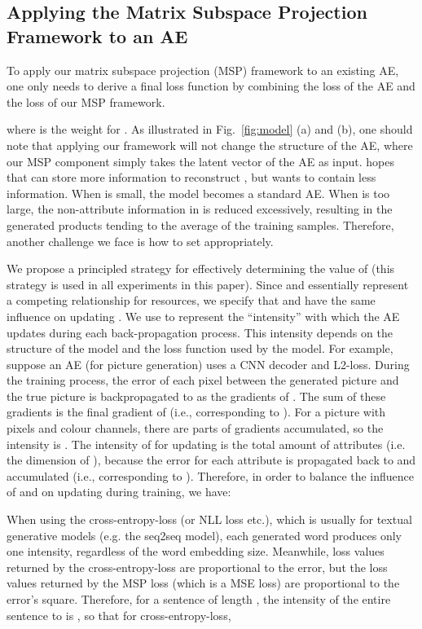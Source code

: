 \documentclass{article}
\begin{document}
\subsection{Applying the Matrix Subspace Projection Framework to an AE} \label{sec:totalLoss}


To apply our matrix subspace projection (MSP) framework to an existing AE, one only needs to derive a final loss function by combining the loss of the AE and the loss of our MSP framework. 

where  is the weight for . As illustrated in Fig.~\ref{fig:model} (a) and (b), one should note that applying our framework will not change the structure of the AE, where our MSP component simply takes the latent vector  of the AE as input.  hopes that  can store more information to reconstruct , but  wants  to contain less information. When  is small, the model becomes a standard AE. When  is too large, the non-attribute information in  is reduced excessively, resulting in the generated products tending to the average of the training samples. Therefore, another challenge we face is how to set  appropriately. 


We propose a principled strategy for effectively determining the value of  (this strategy is used in all experiments in this paper). Since  and  essentially represent a competing relationship for  resources, we specify that  and  have the same influence on updating . We use  to represent the ``intensity'' with which the AE updates  during each back-propagation process. This intensity depends on the structure of the model and the loss function used by the model.
For example, suppose an AE (for picture generation) uses a CNN decoder and L2-loss. During the training process, the error of each pixel between the generated picture and the true picture is backpropagated to  as the gradients of . The sum of these gradients is the final gradient of  (i.e., corresponding to ). For a picture with  pixels and  colour channels, there are  parts of gradients accumulated, so the intensity is . The intensity of  for updating  is the total amount of attributes (i.e. the dimension of ), because the error for each attribute is propagated back to  and accumulated (i.e., corresponding to ). Therefore, in order to balance the influence of  and  on updating  during training, we have: 



When using the cross-entropy-loss (or NLL loss etc.), which is usually for textual generative models (e.g. the seq2seq model), each generated word produces only one intensity, regardless of the word embedding size. 
Meanwhile, loss values returned by the cross-entropy-loss are proportional to the error, but the loss values returned by the MSP loss (which is a MSE loss) are proportional to the error's square.
Therefore, for a sentence of length , the intensity of the entire sentence to  is , so that for cross-entropy-loss,
\end{document}

